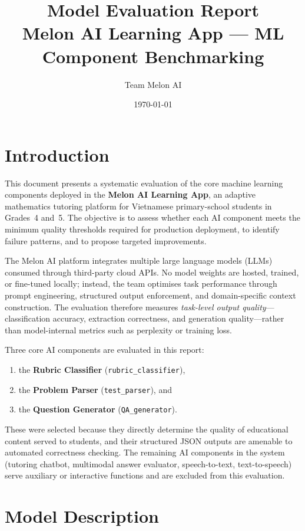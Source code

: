 \documentclass[12pt, a4paper]{article}
\title{\textbf{Model Evaluation Report}\\[0.3em]
\large Melon AI Learning App — ML Component Benchmarking}
\author{Team Melon AI}
\date{\today}
\begin{document}
\maketitle

\section{Introduction}
\label{sec:introduction}

This document presents a systematic evaluation of the core machine learning components deployed in the \textbf{Melon AI Learning App}, an adaptive mathematics tutoring platform for Vietnamese primary-school students in Grades~4 and~5. The objective is to assess whether each AI component meets the minimum quality thresholds required for production deployment, to identify failure patterns, and to propose targeted improvements.

The Melon AI platform integrates multiple large language models (LLMs) consumed through third-party cloud APIs. No model weights are hosted, trained, or fine-tuned locally; instead, the team optimises task performance through prompt engineering, structured output enforcement, and domain-specific context construction. The evaluation therefore measures \emph{task-level output quality}---classification accuracy, extraction correctness, and generation quality---rather than model-internal metrics such as perplexity or training loss.

Three core AI components are evaluated in this report:
\begin{enumerate}[nosep]
    \item the \textbf{Rubric Classifier} (\texttt{rubric\_classifier}),
    \item the \textbf{Problem Parser} (\texttt{test\_parser}), and
    \item the \textbf{Question Generator} (\texttt{QA\_generator}).
\end{enumerate}
These were selected because they directly determine the quality of educational content served to students, and their structured JSON outputs are amenable to automated correctness checking. The remaining AI components in the system (tutoring chatbot, multimodal answer evaluator, speech-to-text, text-to-speech) serve auxiliary or interactive functions and are excluded from this evaluation.

\section{Model Description}
\label{sec:model-description}
\end{document}
